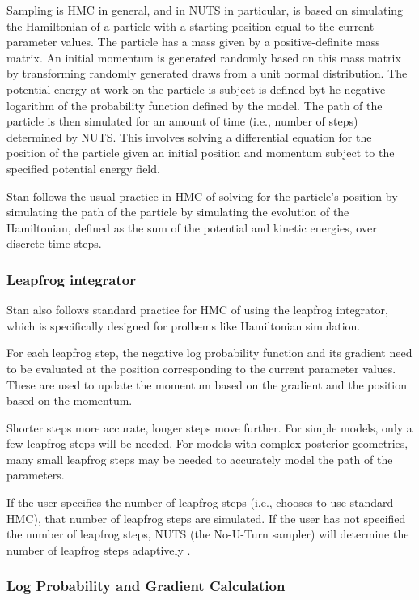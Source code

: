 \documentclass[article]{jss}
\begin{document}
Sampling is HMC in general, and in NUTS in particular, is based on
simulating the Hamiltonian of a particle with a starting position
equal to the current parameter values.  The particle has a mass given
by a positive-definite mass matrix.  An initial momentum is generated
randomly based on this mass matrix by transforming randomly generated
draws from a unit normal distribution.  The potential energy at work
on the particle is subject is defined byt he negative logarithm of the
probability function defined by the model.  The path of the particle
is then simulated for an amount of time (i.e., number of steps)
determined by NUTS.  This involves solving a differential equation for
the position of the particle given an initial position and momentum
subject to the specified potential energy field.

Stan follows the usual practice in HMC of solving for the particle's
position by simulating the path of the particle by simulating the
evolution of the Hamiltonian, defined as the sum of the potential and
kinetic energies, over discrete time steps.  

\subsubsection{Leapfrog integrator}

Stan also follows standard practice for HMC of using the leapfrog
integrator, which is specifically designed for prolbems like
Hamiltonian simulation.

For each leapfrog step, the negative log probability function and its
gradient need to be evaluated at the position corresponding to the
current parameter values.  These are used to update the momentum based
on the gradient and the position based on the momentum.

Shorter steps more accurate, longer steps move further.  For simple
models, only a few leapfrog steps will be needed.  For models with
complex posterior geometries, many small leapfrog steps may be needed
to accurately model the path of the parameters.

If the user specifies the number of leapfrog steps (i.e., chooses to
use standard HMC), that number of leapfrog steps are simulated.  If
the user has not specified the number of leapfrog steps, NUTS (the No-U-Turn
sampler) will determine the number of leapfrog steps adaptively
\citep{Hoffman-Gelman:2011}.

\subsubsection{Log Probability and Gradient Calculation}
\end{document}
